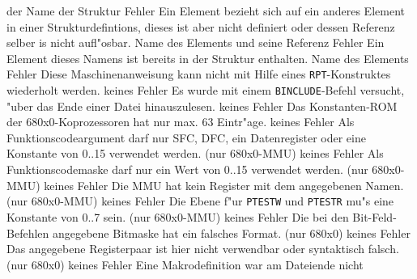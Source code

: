 \documentclass[12pt,a4paper,twoside]{report}
\newcommand{\tty}[1]{{\tt #1}}
\begin{document}
\begin{description}
               {der Name der Struktur}
               {Fehler}
               {Ein Element bezieht sich auf ein anderes Element in
                einer Strukturdefintions, dieses ist aber nicht
                definiert oder dessen Referenz selber is nicht
                aufl"osbar.}
               {Name des Elements und seine Referenz}
               {Fehler}
               {Ein Element dieses Namens ist bereits in der Struktur
                enthalten.}
               {Name des Elements}
               {Fehler}
               {Diese Maschinenanweisung kann nicht mit Hilfe eines
                {\tt RPT}-Konstruktes wiederholt werden.}
               {keines}
               {Fehler}
               {Es wurde mit einem \tty{BINCLUDE}-Befehl versucht,
                "uber das Ende einer Datei hinauszulesen.}
               {keines}
               {Fehler}
               {Das Konstanten-ROM der 680x0-Koprozessoren hat
                nur max. 63 Eintr"age.}
               {keines}
               {Fehler}
               {Als Funktionscodeargument darf nur SFC, DFC, ein
                Datenregister oder eine Konstante von 0..15 verwendet
                werden. (nur 680x0-MMU)}
               {keines}
               {Fehler}
               {Als Funktionscodemaske darf nur ein Wert von
                0..15 verwendet werden. (nur 680x0-MMU)}
               {keines}
               {Fehler}
               {Die MMU hat kein Register mit dem angegebenen
                Namen. (nur 680x0-MMU)}
               {keines}
               {Fehler}
               {Die Ebene f"ur \tty{PTESTW} und \tty{PTESTR} mu"s eine
                Konstante von 0..7 sein. (nur 680x0-MMU)}
               {keines}
               {Fehler}
               {Die bei den Bit-Feld-Befehlen angegebene
                Bitmaske hat ein falsches Format. (nur 680x0)}
               {keines}
               {Fehler}
               {Das angegebene Registerpaar ist hier nicht
                verwendbar oder syntaktisch falsch. (nur 680x0)}
               {keines}
               {Fehler}
               {Eine Makrodefinition war am Dateiende nicht
}
\end{description}
\end{document}
